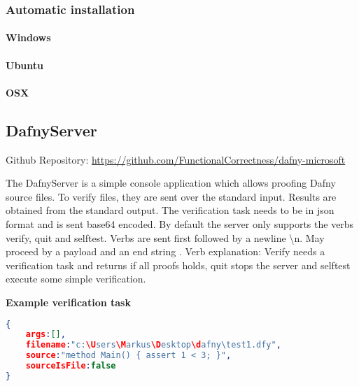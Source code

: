 \subsubsection{Automatic installation}
\paragraph{Windows}

\paragraph{Ubuntu}

\paragraph{OSX}


\subsection{DafnyServer}
Github Repository: \href{https://github.com/FunctionalCorrectness/dafny-microsoft}{https://github.com/FunctionalCorrectness/dafny-microsoft}

The DafnyServer is a simple console application which allows proofing Dafny source files. To verify files, they are sent over the standard input. Results are obtained from the standard output. The verification task needs to be in json format  and is sent base64 encoded. By default the server only supports the verbs verify, quit and selftest. Verbs are sent first followed by a newline \textbackslash{n}. May proceed by a payload and an end string . 
Verb explanation: Verify needs a verification task and returns if all proofs holds, quit stops the server and selftest execute some simple verification. 

\textbf{Example verification task}
\begin{lstlisting}[language=json,firstnumber=1]
{
	args:[],
	filename:"c:\Users\Markus\Desktop\dafny\test1.dfy",
	source:"method Main() {	assert 1 < 3; }",
	sourceIsFile:false
}

\end{lstlisting}

